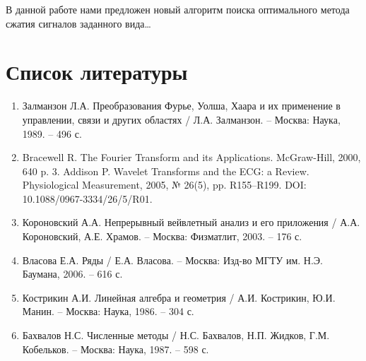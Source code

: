 \documentclass[11pt, oneside, a4paper]{article}
\begin{document}
В данной работе нами предложен новый алгоритм поиска оптимального метода сжатия сигналов заданного вида…

\section{Список литературы}

\begin{enumerate} 
\item Залманзон Л.А. Преобразования Фурье, Уолша, Хаара и их применение в управлении, связи и других областях / Л.А. Залманзон. – Москва: Наука, 1989. – 496 с.
\item Bracewell R. The Fourier Transform and its Applications. McGraw-Hill, 2000, 640 p.
3. Addison P. Wavelet Transforms and the ECG: a Review. Physiological Measurement, 2005, № 26(5), pp. R155–R199. DOI: 10.1088/0967-3334/26/5/R01.
\item Короновский А.А. Непрерывный вейвлетный анализ и его приложения / А.А. Короновский, А.Е. Храмов. – Москва: Физматлит, 2003. – 176 с.
\item Власова Е.А. Ряды / Е.А. Власова. – Москва: Изд-во МГТУ им. Н.Э. Баумана, 2006. – 616 с.
\item Кострикин А.И. Линейная алгебра и геометрия / А.И. Кострикин, Ю.И. Манин. – Москва: Наука, 1986. – 304 с.
\item Бахвалов Н.С. Численные методы / Н.С. Бахвалов, Н.П. Жидков, Г.М. Кобельков. – Москва: Наука, 1987. – 598 с.
\end{enumerate}
\end{document}
